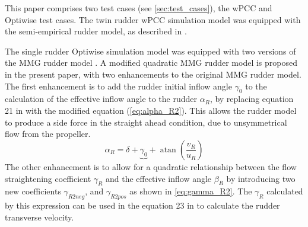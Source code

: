 This paper comprises two test cases (see \autoref{sec:test_cases}), the wPCC and Optiwise test cases.
The twin rudder wPCC simulation model was equipped with the semi-empirical rudder model, as described in \citet{alexanderssonSystemIdentificationPhysicsinformed2024b}.

The single rudder Optiwise simulation model was equipped with two versions of the MMG rudder model \citep{yasukawaIntroductionMMGStandard2015}.
A modified quadratic MMG rudder model is proposed in the present paper, with two enhancements to the original MMG rudder model. The first enhancement is to add the rudder initial inflow angle $\gamma_0$ to the calculation of the effective inflow angle to the rudder $\alpha_R$, by replacing equation 21 in \citet{yasukawaIntroductionMMGStandard2015} with the modified equation (\autoref{eq:alpha_R2}). This allows the rudder model to produce a side force in the straight ahead condition, due to unsymmetrical flow from the propeller. 
\begin{equation}
    \label{eq:alpha_R2}
    \alpha_{R} = \delta + \underbrace{\gamma_{0}}_{~} + \operatorname{atan}{\left(\frac{v_{R}}{u_{R}} \right)}
\end{equation}
The other enhancement is to allow for a quadratic relationship between the flow straightening coefficient $\gamma_R$ and the effective inflow angle $\beta_R$ by introducing two new coefficients $\gamma_{R2neg}$, and $\gamma_{R2pos}$ as shown in \autoref{eq:gamma_R2}. The $\gamma_R$ calculated by this expression can be used in the equation 23 in \citet{yasukawaIntroductionMMGStandard2015} to calculate the rudder transverse velocity.  
\begin{equation}
    \label{eq:gamma_R2}
    
\end{equation}

